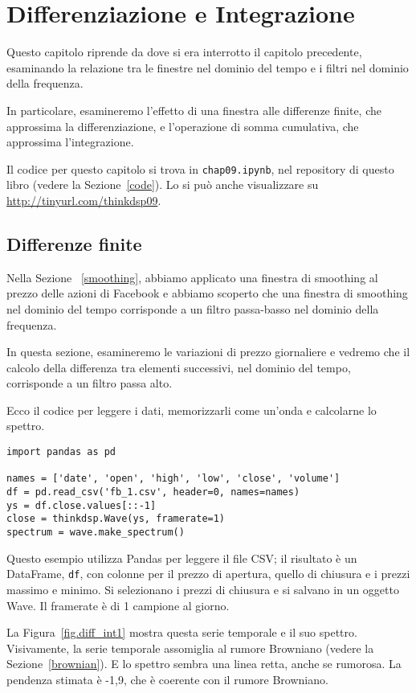 \documentclass[12pt,a4paper]{book}
\begin{document}
\chapter{Differenziazione e Integrazione} \label{diffint} 

Questo capitolo riprende da dove si era interrotto il capitolo precedente, esaminando la relazione tra le finestre nel dominio del tempo e i filtri nel dominio della frequenza.

In particolare, esamineremo l'effetto di una finestra alle differenze finite, che approssima la differenziazione, e l'operazione di somma cumulativa, che approssima l'integrazione.

Il codice per questo capitolo si trova in {\tt chap09.ipynb}, nel repository di questo libro (vedere la Sezione~\ref{code}). Lo si può anche visualizzare su \url{http://tinyurl.com/thinkdsp09}.

\section{Differenze finite} \label{diffs} 

Nella Sezione ~\ref{smoothing}, abbiamo applicato una finestra di smoothing al prezzo delle azioni di Facebook e abbiamo scoperto che una finestra di smoothing nel dominio del tempo corrisponde a un filtro passa-basso nel dominio della frequenza.

In questa sezione, esamineremo le variazioni di prezzo giornaliere e vedremo che il calcolo della differenza tra elementi successivi, nel dominio del tempo, corrisponde a un filtro passa alto.

Ecco il codice per leggere i dati, memorizzarli come un'onda e calcolarne lo spettro.

\begin{verbatim} 
import pandas as pd

names = ['date', 'open', 'high', 'low', 'close', 'volume']
df = pd.read_csv('fb_1.csv', header=0, names=names)
ys = df.close.values[::-1]
close = thinkdsp.Wave(ys, framerate=1)
spectrum = wave.make_spectrum()
 \end{verbatim} 

Questo esempio utilizza Pandas per leggere il file CSV; il risultato è un DataFrame, {\tt df}, con colonne per il prezzo di apertura, quello di chiusura e i prezzi massimo e minimo. Si selezionano i prezzi di chiusura e si salvano in un oggetto Wave. Il framerate è di 1 campione al giorno.

La Figura~\ref{fig.diff_int1} mostra questa serie temporale e il suo spettro. Visivamente, la serie temporale assomiglia al rumore Browniano (vedere la Sezione~\ref{brownian}). E lo spettro sembra una linea retta, anche se rumorosa. La pendenza stimata è -1,9, che è coerente con il rumore Browniano.
\end{document}
